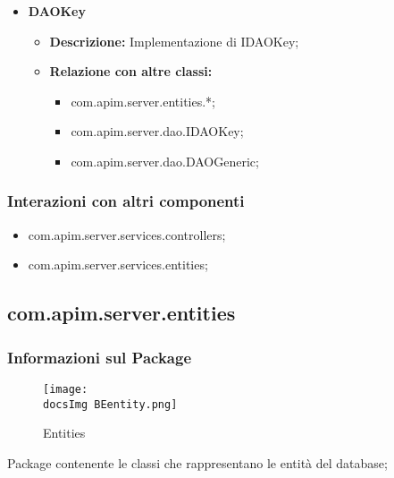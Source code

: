 {{{{{\begin{itemize}
\begin{itemize}
            \begin{itemize}
              \item com.apim.server.dao.DAOFactory;
            \end{itemize}
          \end{itemize}
          \item \textbf{DAOKey}
          \begin{itemize}
            \item \textbf{Descrizione:} Implementazione di IDAOKey;
            \item \textbf{Relazione con altre classi:}
            \begin{itemize}
              \item com.apim.server.entities.*;
              \item com.apim.server.dao.IDAOKey;
              \item com.apim.server.dao.DAOGeneric;
            \end{itemize}
          \end{itemize}
       \end{itemize}
       \subsubsection{Interazioni con altri componenti}
          \begin{itemize}
            \item com.apim.server.services.controllers;
            \item com.apim.server.services.entities;
          \end{itemize}
          
          
          \subsection{com.apim.server.entities}{
    \subsubsection{Informazioni sul Package}
        \begin{figure}[ht]
          \centering
          \texttt{[image: \\docsImg BEentity.png]}
          \caption{Entities}
          \label{Entities}
        \end{figure}
       Package contenente le classi che rappresentano le entità del database;
}}}}}}
